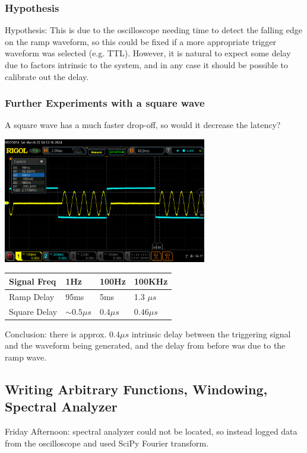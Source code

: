 \documentclass{article}
\begin{document}
    \subsubsection*{Hypothesis}
    Hypothesis: This is due to the oscilloscope needing time to detect the falling edge on the ramp waveform, so this could be fixed if a more appropriate trigger waveform was selected (e.g. TTL). However, it is natural to expect some delay due to factors intrinsic to the system, and in any case it should be possible to calibrate out the delay.
    \subsubsection*{Further Experiments with a square wave}
    A square wave has a much faster drop-off, so would it decrease the latency? 
    \begin{mdframed}[backgroundcolor=gray!20, align = center, userdefinedwidth = 3.8in]
    \includegraphics[width = 3.5in]{img/TriggerTestSq.png}
    \end{mdframed}
    \begin{table}[H]
    \centering
    \begin{tabular}{|l|l|l|l|}
    \hline
    Signal Freq & 1Hz & 100Hz & 100KHz \\ \hline
    Ramp Delay & 95ms & 5ms & 1.3 $\mu s$ \\ \hline
    Square Delay & $\sim 0.5 \mu s$ & $0.4 \mu s$ & $0.46 \mu s$ \\ \hline
    \end{tabular}
    \end{table}
    Conclusion: there is approx. $0.4\mu s$ intrinsic delay between the triggering signal and the waveform being generated, and the delay from before was due to the ramp wave.
    \newpage
    \subsection*{Writing Arbitrary Functions, Windowing, Spectral Analyzer}
    Friday Afternoon: spectral analyzer could not be located, so instead logged data from the oscilloscope and used SciPy Fourier transform.
\end{document}
